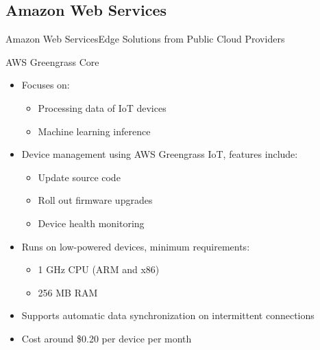\documentclass[10pt,xcolor={dvipsnames}]{beamer}
\renewcommand{\logofile}{example-grid-100x100pt}
\renewcommand{\logoscale}{0.0}
\begin{document}
\subsection{Amazon Web Services}
\renewcommand{\logofile}{img/aws}
\renewcommand{\logoscale}{0.7}
\begin{frame}{Amazon Web Services}{Edge Solutions from Public Cloud Providers}
\begin{block}{AWS Greengrass Core}
  \begin{itemize}
    \item Focuses on:
    \begin{itemize}
        \item Processing data of IoT devices
        \item Machine learning inference
    \end{itemize}
    \item Device management using AWS Greengrass IoT, features include:
    \begin{itemize}
        \item Update source code
        \item Roll out firmware upgrades
        \item Device health monitoring
    \end{itemize}
    \item Runs on low-powered devices, minimum requirements:
    \begin{itemize}
        \item 1 GHz CPU (ARM and x86)
        \item 256 MB RAM
    \end{itemize}
    \item Supports automatic data synchronization on intermittent connections
    \item Cost around \$0.20 per device per month
  \end{itemize}
  
\end{block}
\end{frame}

\end{document}
